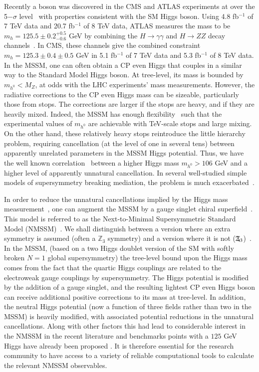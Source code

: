 \documentclass[final,3p,times]{elsarticle}
\newcommand{\Zv}{\,\mathbf{\backslash}\mkern-11.0mu{\mathbb{Z}}_{3}} %
\begin{document}
Recently a boson was discovered in the CMS and 
ATLAS experiments at over the 5$-\sigma$
level~\cite{Aad:2012tfa,Chatrchyan:2012ufa} with properties consistent
with the SM Higgs boson. Using 4.8 fb$^{-1}$ of 7 TeV data and 20.7
fb$^{-1}$ of 8 TeV data, ATLAS measures the mass to be
$m_h=125.5\pm0.2^{+0.5}_{-0.6}$ GeV by combining the $H \rightarrow \gamma
\gamma$ and $H \rightarrow ZZ$ decay channels~\cite{ATLAS-CONF-2013-014}.
In CMS, these channels give the combined constraint $m_h=125.3 \pm0.4 \pm0.5$
GeV in 5.1 fb$^{-1}$ of 7 TeV data and 5.3 fb$^{-1}$ of 8 TeV data. 
In the MSSM, one can often obtain a CP even Higgs that couples in a similar
way to the Standard Model Higgs boson. At tree-level, its mass is bounded by
$m_{h^0} < M_Z$, at odds with the LHC experiments' mass measurements. 
However,
the radiative corrections to the CP even Higgs mass can be sizeable,
particularly those from stops. The corrections are larger if the stops are
heavy, and if they are heavily mixed. Indeed, the MSSM has enough
flexibility~\cite{Djouadi:2013lra} such that the experimental values of
$m_{h^0}$ are achievable with TeV-scale stops and large mixing. On the other
hand, these relatively heavy stops reintroduce the little hierarchy problem,
requiring cancellation (at the level of one in several tens) 
between apparently unrelated parameters in the MSSM Higgs potential. 
Thus, we have the well known correlation~\cite{Barbieri:1998uv} between a
higher Higgs mass $m_{h^0}>106$ GeV and a higher level of apparently unnatural
cancellation. In several
well-studied simple models of supersymmetry breaking mediation, the
problem is much exacerbated~\cite{Arbey:2011ab}. 

In order to reduce the unnatural cancellations implied by the Higgs mass
measurement~\cite{Delgado:2010uj,Ellwanger:2011mu,King:2012tr,Perelstein:2012qg,Gherghetta:2012gb}, 
one can augment the MSSM by a gauge singlet chiral
superfield~\cite{BasteroGil:2000bw,Ellwanger:2009dp,Maniatis:2009re}. This model is referred to as the 
Next-to-Minimal 
Supersymmetric Standard Model (NMSSM)~\cite{NMSSM}. We shall distinguish
between a 
version where an extra symmetry is assumed (often a $\mathbb{Z}_3$ symmetry) 
and a version where it is not
($\Zv$)~\cite{Delgado:2010uj,Ell08,Ross:2011xv,Ross:2012nr}. 
In the MSSM, (based on a two Higgs doublet version of the SM with
softly broken $N=1$ global supersymmetry)
the tree-level bound upon the Higgs mass comes from the fact that 
the quartic Higgs couplings are related to the electroweak gauge couplings by
supersymmetry. The Higgs potential is modified by the addition of a gauge
singlet, and the resulting lightest CP even Higgs boson can receive additional
positive corrections to its mass at tree-level. In addition, the neutral Higgs
potential (now a function of three fields rather than two in the MSSM) is
heavily modified, with associated potential reductions in the unnatural
cancellations. Along with other factors this had lead to considerable interest in the NMSSM
in the recent literature and benchmarks points with a $125$ GeV Higgs have already been proposed \cite{King:2012is}.
It is therefore essential for the research community
to have access to a variety of reliable computational tools to calculate the relevant NMSSM observables. 
\end{document}
